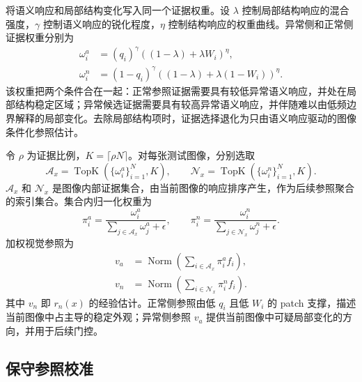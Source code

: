 \method{} 将语义响应和局部结构变化写入同一个证据权重。设 $\lambda$ 控制局部结构响应的混合强度，$\gamma$ 控制语义响应的锐化程度，$\eta$ 控制结构响应的权重曲线。异常侧和正常侧证据权重分别为
\begin{align}
  \omega_i^a &=
  (q_i)^\gamma\left((1-\lambda)+\lambda W_i\right)^\eta, \\
  \omega_i^n &=
  (1-q_i)^\gamma\left((1-\lambda)+\lambda(1-W_i)\right)^\eta .
  \label{eq:evidence-weights}
\end{align}
该权重把两个条件合在一起：正常参照证据需要具有较低异常语义响应，并处在局部结构稳定区域；异常候选证据需要具有较高异常语义响应，并伴随难以由低频边界解释的局部变化。去除局部结构项时，证据选择退化为只由语义响应驱动的图像条件化参照估计。

令 $\rho$ 为证据比例，$K=\lceil \rho N\rceil$。对每张测试图像，分别选取
\begin{equation}
  \mathcal{A}_x=\operatorname{TopK}(\{\omega_i^a\}_{i=1}^{N},K),
  \qquad
  \mathcal{N}_x=\operatorname{TopK}(\{\omega_i^n\}_{i=1}^{N},K).
  \label{eq:evidence-sets}
\end{equation}
$\mathcal{A}_x$ 和 $\mathcal{N}_x$ 是图像内部证据集合，由当前图像的响应排序产生，作为后续参照聚合的索引集合。集合内归一化权重为
\begin{equation}
  \pi_i^a=
  \frac{\omega_i^a}{\sum_{j\in\mathcal{A}_x}\omega_j^a+\epsilon},
  \qquad
  \pi_i^n=
  \frac{\omega_i^n}{\sum_{j\in\mathcal{N}_x}\omega_j^n+\epsilon}.
\end{equation}
加权视觉参照为
\begin{align}
  v_a &= \operatorname{Norm}\left(
  \sum_{i\in\mathcal{A}_x}\pi_i^a f_i\right), \\
  v_n &= \operatorname{Norm}\left(
  \sum_{i\in\mathcal{N}_x}\pi_i^n f_i\right).
  \label{eq:visual-references}
\end{align}
其中 $v_n$ 即 $r_n(x)$ 的经验估计。正常侧参照由低 $q_i$ 且低 $W_i$ 的 patch 支撑，描述当前图像中占主导的稳定外观；异常侧参照 $v_a$ 提供当前图像中可疑局部变化的方向，并用于后续门控。

\subsection{保守参照校准}


